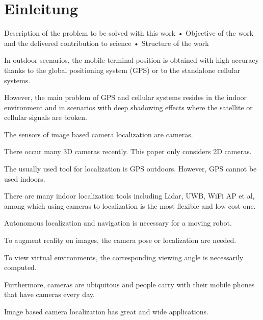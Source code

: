 
\section{Einleitung}

Description of the problem to be solved with this work
• Objective of the work and the delivered contribution to science
• Structure of the work




In outdoor scenarios, the mobile terminal position
is obtained with high accuracy thanks to the global positioning
system (GPS) or to the standalone cellular systems. 

However, the
main problem of GPS and cellular systems resides in the indoor
environment and in scenarios with deep shadowing effects where
the satellite or cellular signals are broken.


The sensors of image based camera localization are cameras. 


There occur many 3D cameras
recently. This paper only considers 2D cameras. 


The usually used tool for localization is GPS
outdoors. However, GPS cannot be used indoors. 

There are many indoor localization tools
including Lidar, UWB, WiFi AP et al, among which using cameras to localization is the most
flexible and low cost one. 

Autonomous localization and navigation is necessary for a moving
robot. 


To augment reality on images, the camera pose or localization are needed. 

To view virtual
environments, the corresponding viewing angle is necessarily computed. 


Furthermore, cameras
are ubiquitous and people carry with their mobile phones that have cameras every day. 

Image
based camera localization has great and wide applications.
\cite{wuImageBasedCamera2016}